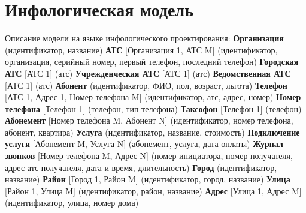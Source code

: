 \documentclass{report}
\begin{document}
\section{Инфологическая модель}
Описание модели на языке инфологического проектирования:
\newline\textbf{Организация} (идентификатор, название)
\newline\textbf{АТС} [Организация 1, АТС M] (идентификатор, организация, серийный номер, первый телефон, последний телефон)
\newline\textbf{Городская АТС} [АТС 1] (атс)
\newline\textbf{Учрежденческая АТС} [АТС 1] (атс)
\newline\textbf{Ведомственная АТС} [АТС 1] (атс)
\newline\textbf{Абонент} (идентификатор, ФИО, пол, возраст, льгота)
\newline\textbf{Телефон} [АТС 1, Адрес 1, Номер телефона M] (идентификатор, атс, адрес, номер)
\newline\textbf{Номер телефона} [Телефон 1] (телефон, тип телефона)
\newline\textbf{Таксофон} [Телефон 1] (телефон)
\newline\textbf{Абонемент} [Номер телефона M, Абонент N] (идентификатор, 
номер телефона, абонент, квартира)
\newline\textbf{Услуга} (идентификатор, название, стоимость)
\newline\textbf{Подключение услуги} [Абонемент M, Услуга N] (абонемент, услуга, дата оплаты)
\newline\textbf{Журнал звонков} [Номер телефона M, Адрес N] 
(номер инициатора, номер получателя, адрес атс получателя, дата и время, длительность)
\newline\textbf{Город} (идентификатор, название)
\newline\textbf{Район} [Город 1, Район M] (идентификатор, город, название)
\newline\textbf{Улица} [Район 1, Улица M] (идентификатор, район, название)
\newline\textbf{Адрес} [Улица 1, Адрес M] (идентификатор, улица, номер дома)
\end{document}
